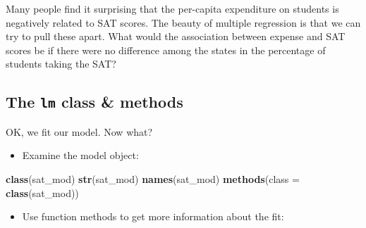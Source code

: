 \documentclass[]{book}
\newenvironment{Shaded}{\begin{snugshade}}{\end{snugshade}}
\newcommand{\KeywordTok}[1]{\textcolor[rgb]{0.13,0.29,0.53}{\textbf{#1}}}
\newcommand{\DataTypeTok}[1]{\textcolor[rgb]{0.13,0.29,0.53}{#1}}
\newcommand{\DecValTok}[1]{\textcolor[rgb]{0.00,0.00,0.81}{#1}}
\newcommand{\StringTok}[1]{\textcolor[rgb]{0.31,0.60,0.02}{#1}}
\newcommand{\OperatorTok}[1]{\textcolor[rgb]{0.81,0.36,0.00}{\textbf{#1}}}
\newcommand{\NormalTok}[1]{#1}
\providecommand{\tightlist}{%
  \setlength{\itemsep}{0pt}\setlength{\parskip}{0pt}}
\begin{document}
Many people find it surprising that the per-capita expenditure on
students is negatively related to SAT scores. The beauty of multiple
regression is that we can try to pull these apart. What would the
association between expense and SAT scores be if there were no
difference among the states in the percentage of students taking the
SAT?

\begin{Shaded}
\end{Shaded}

\subsection{\texorpdfstring{The \texttt{lm} class \&
methods}{The lm class \& methods}}\label{the-lm-class-methods}

OK, we fit our model. Now what?

\begin{itemize}
\tightlist
\item
  Examine the model object:
\end{itemize}

\begin{Shaded}
\begin{Highlighting}[]
  \KeywordTok{class}\NormalTok{(sat_mod)}
  \KeywordTok{str}\NormalTok{(sat_mod)}
  \KeywordTok{names}\NormalTok{(sat_mod)}
  \KeywordTok{methods}\NormalTok{(}\DataTypeTok{class =} \KeywordTok{class}\NormalTok{(sat_mod))}
\end{Highlighting}
\end{Shaded}

\begin{itemize}
\tightlist
\item
  Use function methods to get more information about the fit:
\end{itemize}

\begin{Shaded}
\end{Shaded}
\end{document}
